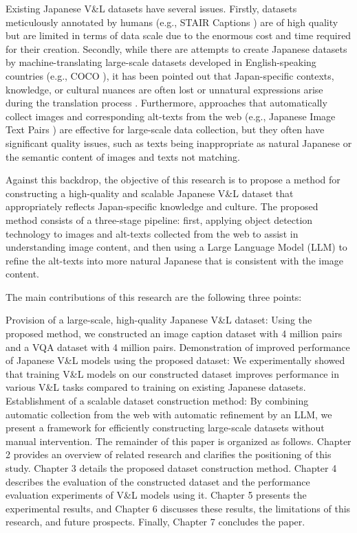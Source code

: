 \documentclass[11pt]{article}
\begin{document}
Existing Japanese V\&L datasets have several issues. Firstly, datasets meticulously annotated by humans (e.g., STAIR Captions \cite{Yoshikawa2017}) are of high quality but are limited in terms of data scale due to the enormous cost and time required for their creation. Secondly, while there are attempts to create Japanese datasets by machine-translating large-scale datasets developed in English-speaking countries (e.g., COCO \cite{lin2014microsoft}), it has been pointed out that Japan-specific contexts, knowledge, or cultural nuances are often lost or unnatural expressions arise during the translation process \cite{sasagawa2024constructing}. Furthermore, approaches that automatically collect images and corresponding alt-texts from the web (e.g., Japanese Image Text Pairs \cite{sasagawa2024constructing}) are effective for large-scale data collection, but they often have significant quality issues, such as texts being inappropriate as natural Japanese or the semantic content of images and texts not matching.

Against this backdrop, the objective of this research is to propose a method for constructing a high-quality and scalable Japanese V\&L dataset that appropriately reflects Japan-specific knowledge and culture. The proposed method consists of a three-stage pipeline: first, applying object detection technology to images and alt-texts collected from the web to assist in understanding image content, and then using a Large Language Model (LLM) to refine the alt-texts into more natural Japanese that is consistent with the image content.

The main contributions of this research are the following three points:

Provision of a large-scale, high-quality Japanese V\&L dataset: Using the proposed method, we constructed an image caption dataset with 4 million pairs and a VQA dataset with 4 million pairs.
Demonstration of improved performance of Japanese V\&L models using the proposed dataset: We experimentally showed that training V\&L models on our constructed dataset improves performance in various V\&L tasks compared to training on existing Japanese datasets.
Establishment of a scalable dataset construction method: By combining automatic collection from the web with automatic refinement by an LLM, we present a framework for efficiently constructing large-scale datasets without manual intervention.
The remainder of this paper is organized as follows. Chapter 2 provides an overview of related research and clarifies the positioning of this study. Chapter 3 details the proposed dataset construction method. Chapter 4 describes the evaluation of the constructed dataset and the performance evaluation experiments of V\&L models using it. Chapter 5 presents the experimental results, and Chapter 6 discusses these results, the limitations of this research, and future prospects. Finally, Chapter 7 concludes the paper.
\end{document}
